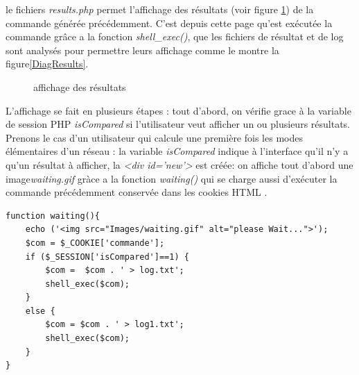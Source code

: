 le fichiers \emph{results.php} permet l'affichage des résultats (voir figure \ref{Results}) de la commande générée précédemment. C'est depuis cette page qu'est exécutée la commande grâce a la fonction \emph{shell\_exec()}, que les fichiers de résultat et de log sont analysés pour permettre leurs affichage comme le montre la figure\ref{DiagResults}.\\

\begin{figure}[!ht]
	\begin{center}
		\caption{affichage des résultats}
  		\label{Results}
  	\end{center}	
\end{figure}

L'affichage se fait en plusieurs étapes : tout d'abord, on vérifie grace à la variable de session PHP \emph{isCompared} si l'utilisateur veut afficher un ou plusieurs résultats.\\
Prenons le cas d'un utilisateur qui calcule une première fois les modes élémentaires d'un réseau : la variable \emph{isCompared} indique à l'interface qu'il n'y a qu'un résultat à afficher, la \emph{<div id='new'>} est créée: on affiche tout d'abord une image\emph{waiting.gif} gràce a la fonction \emph{waiting()} qui se charge aussi d'exécuter la commande précédemment conservée dans les cookies HTML .\\

\begin{DDbox}{\linewidth}
\begin{lstlisting}
function waiting(){
	echo ('<img src="Images/waiting.gif" alt="please Wait...">');
	$com = $_COOKIE['commande'];
	if ($_SESSION['isCompared']==1) {
		$com =  $com . ' > log.txt';
		shell_exec($com);
	}
	else {
		$com = $com . ' > log1.txt';
		shell_exec($com);
	}
}
\end{lstlisting}
\end{DDbox}\\

